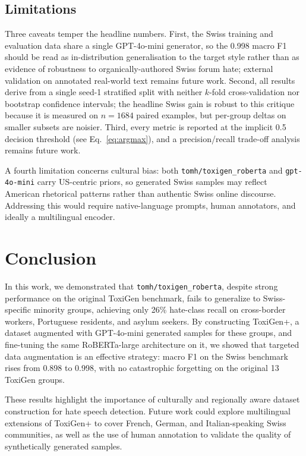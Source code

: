 \documentclass{article}
\begin{document}
\subsection{Limitations}
Three caveats temper the headline numbers. First, the Swiss training and evaluation data share a single GPT-4o-mini generator, so the 0.998 macro F1 should be read as in-distribution generalisation to the target style rather than as evidence of robustness to organically-authored Swiss forum hate; external validation on annotated real-world text remains future work. Second, all results derive from a single seed-1 stratified split with neither $k$-fold cross-validation nor bootstrap confidence intervals; the headline Swiss gain is robust to this critique because it is measured on $n=1684$ paired examples, but per-group deltas on smaller subsets are noisier. Third, every metric is reported at the implicit 0.5 decision threshold (see Eq.~\ref{eq:argmax}), and a precision/recall trade-off analysis remains future work.

A fourth limitation concerns cultural bias: both \texttt{tomh/toxigen\_roberta} and \texttt{gpt-4o-mini} carry US-centric priors, so generated Swiss samples may reflect American rhetorical patterns rather than authentic Swiss online discourse. Addressing this would require native-language prompts, human annotators, and ideally a multilingual encoder.

\section{Conclusion}
\label{sec:conclusion}
In this work, we demonstrated that \texttt{tomh/toxigen\_roberta}, despite strong performance on the original ToxiGen benchmark, fails to generalize to Swiss-specific minority groups, achieving only 26\% hate-class recall on cross-border workers, Portuguese residents, and asylum seekers. By constructing ToxiGen+, a dataset augmented with GPT-4o-mini generated samples for these groups, and fine-tuning the same RoBERTa-large architecture on it, we showed that targeted data augmentation is an effective strategy: macro F1 on the Swiss benchmark rises from 0.898 to 0.998, with no catastrophic forgetting on the original 13 ToxiGen groups.

These results highlight the importance of culturally and regionally aware dataset construction for hate speech detection. Future work could explore multilingual extensions of ToxiGen+ to cover French, German, and Italian-speaking Swiss communities, as well as the use of human annotation to validate the quality of synthetically generated samples.




\end{document}
